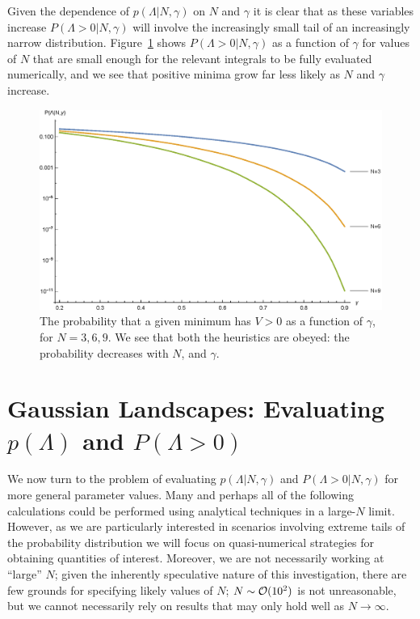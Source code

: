 \documentclass[12pt]{article}
\begin{document}
Given the dependence of $p(\Lambda|N,\gamma)$ on $N$ and $\gamma$ it is clear that as these variables increase $P(\Lambda>0|N,\gamma)$ will involve the increasingly small tail of an increasingly narrow distribution. Figure~\ref{N6} shows $P(\Lambda>0|N,\gamma)$ as a function of $\gamma$ for values of $N$ that are small enough for the relevant integrals to be fully evaluated numerically, and we see that positive minima grow far less likely as $N$ and $\gamma$ increase. 

\begin{figure}
  \centering
  \includegraphics[width=\linewidth]{N369.eps}
  \caption{The probability that a given minimum has $V > 0$ as a function of $\gamma$, for $N=3, 6, 9$. We see that both the heuristics are obeyed: the probability decreases with $N$, and  $\gamma$.}
  \label{N6}
  \end{figure}


\section{Gaussian Landscapes: Evaluating $p(\Lambda)$ and $P(\Lambda>0)$} \label{PeakNumbers}

We now turn to the problem of evaluating $p(\Lambda|N,\gamma)$ and $P(\Lambda>0|N,\gamma)$  for more general parameter values. Many and perhaps all of the following calculations could be performed using analytical techniques in a large-$N$ limit. However,  as we are particularly interested in scenarios involving extreme tails of  the probability distribution we will focus on quasi-numerical strategies for obtaining quantities of interest. Moreover, we are  not necessarily working at ``large'' $N$; given the inherently speculative nature of this investigation, there are few  grounds for specifying likely values of $N$;  $N\sim{\cal O}(10^2)$ is not unreasonable, but we cannot necessarily rely on results that may only hold well as $N\rightarrow \infty$. 
\end{document}
